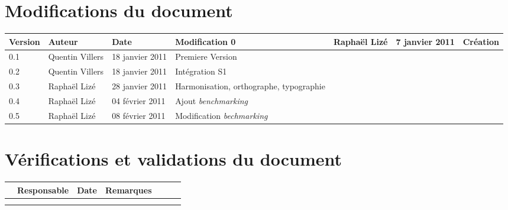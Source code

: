 
\section*{Modifications du document}

\begin{center}
\begin{longtable}{|m{14mm}|m{36mm}|m{36mm}|m{60mm}|}
\hline
Version & Auteur & Date & Modification\endhead \hline
0
& %
Raphaël Lizé
& %
7 janvier 2011
& %
Création
\\\hline
0.1
& %
Quentin Villers
& %
18 janvier 2011
& %
Premiere Version
\\\hline
0.2
& %
Quentin Villers
& %
18 janvier 2011
& %
Intégration S1
\\\hline
0.3
& %
Raphaël Lizé
& %
28 janvier 2011
& %
Harmonisation, orthographe, typographie
\\\hline
0.4
& %
Raphaël Lizé
& %
04 février 2011
& %
Ajout {\sl benchmarking}
\\\hline
0.5
& %
Raphaël Lizé
& %
08 février 2011
& %
Modification {\sl bechmarking}
\\\hline
\end{longtable}
\end{center}


\section*{Vérifications et validations du document}

\begin{center}
\begin{longtable}{|m{15mm}|m{36mm}|m{36mm}|m{60mm}|}
\hline
 & Responsable & Date & Remarques\endhead \hline
& %
& %
& %
\\\hline

& %

& %

& %

\\\hline

& %

& %

& %

\\\hline
\end{longtable}
\end{center}

\pagebreak
